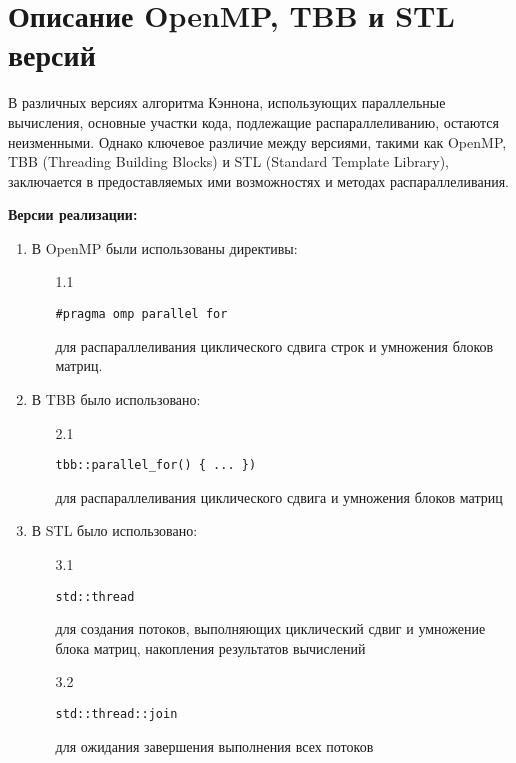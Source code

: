 \documentclass{report}
\begin{document}
\section* {Описание OpenMP, TBB и STL версий}
\par В различных версиях алгоритма Кэннона, использующих параллельные вычисления, основные участки кода, подлежащие распараллеливанию, остаются неизменными. Однако ключевое различие между версиями, такими как OpenMP, TBB (Threading Building Blocks) и STL (Standard Template Library), заключается в предоставляемых ими возможностях и методах распараллеливания.
\par \textbf{Версии реализации:}
\begin{enumerate}
\item В OpenMP были использованы директивы:
\vspace{0.5em}
\begin{enumerate}
\item[1.1] \begin{verbatim}
#pragma omp parallel for
\end{verbatim}

для распараллеливания циклического сдвига строк и умножения блоков матриц.
\end{enumerate}
\item В TBB было использовано:
\vspace{0.5em}
\begin{enumerate}
\item[2.1] \begin{verbatim}
tbb::parallel_for() { ... })
\end{verbatim}
для распараллеливания циклического сдвига и умножения блоков матриц
\end{enumerate}
\item В STL было использовано:
\vspace{0.5em}
\begin{enumerate}
\item[3.1] \begin{verbatim}
std::thread
\end{verbatim}
для создания потоков, выполняющих циклический сдвиг и умножение блока матриц, накопления результатов вычислений
\item[3.2] \begin{verbatim}
std::thread::join
\end{verbatim}
для ожидания завершения выполнения всех потоков
\end{enumerate}
\end{enumerate}
\end{document}
